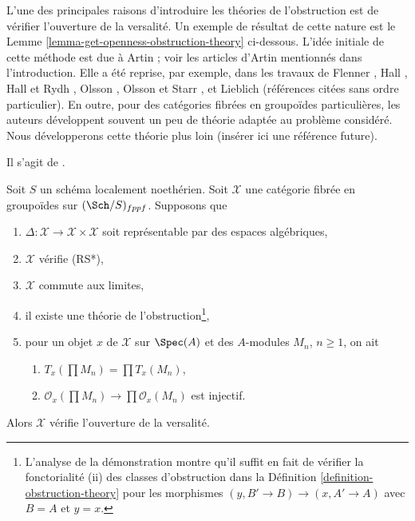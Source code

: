 \medskip\noindent
L'une des principales raisons d'introduire les théories de l'obstruction est de vérifier
l'ouverture de la versalité. Un exemple de résultat de cette nature est le
Lemme \ref{lemma-get-openness-obstruction-theory} ci-dessous.
L'idée initiale de cette méthode est due à Artin ; voir
les articles d'Artin mentionnés dans l'introduction. Elle a été reprise,
par exemple, dans les travaux de Flenner \cite{Flenner},
Hall \cite{Hall-coherent},
Hall et Rydh \cite{rydh_axioms},
Olsson \cite{olsson_deformation},
Olsson et Starr \cite{olsson-starr}, et
Lieblich \cite{lieblich-complexes} (références citées sans ordre particulier).
En outre, pour des catégories fibrées en groupoïdes particulières, les auteurs
développent souvent un peu de théorie adaptée au problème considéré.
Nous développerons cette théorie plus loin (insérer ici une référence future).

\begin{lemma}
\label{lemma-get-openness-obstruction-theory}
\begin{reference}
Il s'agit de \cite[théorème 4.4]{Hall-coherent}.
\end{reference}
Soit $S$ un schéma localement noethérien. Soit $\mathcal{X}$ une catégorie fibrée
en groupoïdes sur $(\Sch/S)_{fppf}$. Supposons que
\begin{enumerate}
\item $\Delta : \mathcal{X} \to \mathcal{X} \times \mathcal{X}$ soit
représentable par des espaces algébriques,
\item $\mathcal{X}$ vérifie (RS*),
\item $\mathcal{X}$ commute aux limites,
\item il existe une théorie de l'obstruction\footnote{L'analyse de la démonstration
montre qu'il suffit en fait de vérifier
la fonctorialité (ii) des classes d'obstruction dans la
Définition \ref{definition-obstruction-theory}
pour les morphismes $(y, B' \to B) \to (x, A' \to A)$
avec $B = A$ et $y = x$.},
\item pour un objet $x$ de $\mathcal{X}$ sur $\Spec(A)$
et des $A$-modules $M_n$, $n \geq 1$, on ait
\begin{enumerate}
\item $T_x(\prod M_n) = \prod T_x(M_n)$,
\item $\mathcal{O}_x(\prod M_n) \to \prod \mathcal{O}_x(M_n)$
est injectif.
\end{enumerate}
\end{enumerate}
Alors $\mathcal{X}$ vérifie l'ouverture de la versalité.
\end{lemma}

